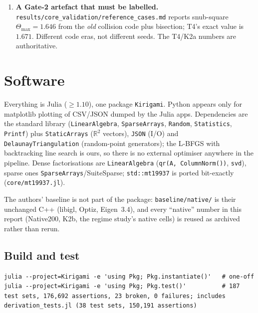 \documentclass[11pt,a4paper]{article}
\theoremstyle{definition}
\newcommand{\Tmax}{\Theta_{\max}}
\newcommand{\file}[1]{\texttt{\small #1}}
\begin{document}
\begin{enumerate}
mobility is still median \textbf{305} (range 36--1675) and the pre-registered clause
$m_{\mathrm{core}}\le5$ holds on \textbf{0 of 167} patches. The 2-core identity
$\dim\ker A = |F\setminus\mathrm{core}_2| + \dim\ker A|_{\mathrm{core}_2}$ holds on 493/508 as
measured, with every exception off by exactly $\pm1$ and 7/7 dense rechecks exact.
\item \textbf{A Gate-2 artefact that must be labelled.}
\file{results/core\_validation/reference\_cases.md} reports snub-square $\Tmax=1.646$ from the
\emph{old} collision code plus bisection; T4's exact value is $1.671$. Different code eras,
not different seeds. The T4/K2a numbers are authoritative.
\end{enumerate}

\clearpage
\section{Software}
\label{sec:software}

Everything is Julia ($\geq 1.10$), one package \file{Kirigami}. Python appears only for matplotlib plotting of CSV/JSON
dumped by the Julia apps. Dependencies are the standard library (\file{LinearAlgebra}, \file{SparseArrays},
\file{Random}, \file{Statistics}, \file{Printf}) plus \file{StaticArrays} ($\mathbb{R}^2$ vectors), \file{JSON} (I/O) and
\file{DelaunayTriangulation} (random-point generators); the L-BFGS with backtracking line search is ours, so there is
no external optimiser anywhere in the pipeline. Dense factorisations are \file{LinearAlgebra} (\file{qr(A, ColumnNorm())},
\file{svd}), sparse ones \file{SparseArrays}/SuiteSparse; \file{std::mt19937} is ported bit-exactly (\file{core/mt19937.jl}).

The authors' baseline is not part of the package: \file{baseline/native/} is their unchanged C++
(libigl, Optiz, Eigen~3.4), and every ``native'' number in this report (Native200, K2b, the regime
study's native cells) is reused as archived rather than rerun.

\subsection{Build and test}

\begin{verbatim}
julia --project=Kirigami -e 'using Pkg; Pkg.instantiate()'   # one-off
julia --project=Kirigami -e 'using Pkg; Pkg.test()'          # 187 test sets, 176,692 assertions, 23 broken, 0 failures; includes derivation_tests.jl (38 test sets, 150,191 assertions)
\end{verbatim}
\end{document}
